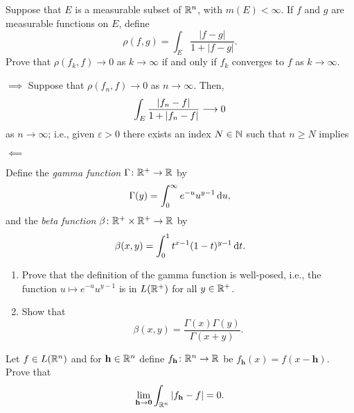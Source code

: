 \begin{problem}
  Suppose that \(E\) is a measurable subset of \(\mathbb{R}^n\), with
  \(m(E)<\infty\). If \(f\) and \(g\) are measurable functions on \(E\),
  define
  \[
    \rho(f,g)=\int_E\frac{|f-g|}{1+|f-g|}.
  \]
  Prove that \(\rho(f_k,f)\to 0\) as \(k\to\infty\) if and only if \(f_k\)
  converges to \(f\) as \(k\to\infty\).
\end{problem}
\begin{solution}
  \(\implies\) Suppose that \(\rho(f_n,f)\to 0\) as \(n\to\infty\). Then,
  \[
    \int_E\frac{|f_n-f|}{1+|f_n-f|}\longrightarrow 0
  \]
  as \(n\to\infty\); i.e., given \(\varepsilon>0\) there exists an index
  \(N\in\mathbb{N}\) such that \(n\geq N\) implies

  \(\impliedby\)
\end{solution}

\begin{problem}
  Define the \emph{gamma function} \(\Gamma\colon\mathbb{R}^+\to\mathbb{R}\) by
  \[
    \Gamma(y)=\int_0^\infty e^{-u}u^{y-1}\mathop{}\!\mathrm{d} u,
  \]
  and the \emph{beta function} \(\beta\colon\mathbb{R}^+\times\mathbb{R}^+\to\mathbb{R}\) by
  \[
    \beta(x,y)=\int_0^1 t^{x-1}(1-t)^{y-1}\mathop{}\!\mathrm{d} t.
  \]
  \begin{enumerate}[label=(\alph*)]
  \item Prove that the definition of the gamma function is well-posed,
    i.e., the function \(u\mapsto e^{-u}u^{y-1}\) is in \(L(\mathbb{R}^+)\) for
    all \(y\in\mathbb{R}^+\).
  \item Show that
    \[
      \beta(x,y)=\frac{\Gamma(x)\Gamma(y)}{\Gamma(x+y)}.
    \]
  \end{enumerate}
\end{problem}
\begin{solution}
\end{solution}

\begin{problem}
  Let \(f\in L(\mathbb{R}^n)\) and for \(\mathbf{h}\in\mathbb{R}^n\) define
  \(f_{\mathbf{h}}\colon\mathbb{R}^n\to\mathbb{R}\) be
  \(f_{\mathbf{h}}( x )= f( x -\mathbf{h})\). Prove that
  \[
    \lim_{\mathbf{h}\to\mathbf{0}}\int_{\mathbb{R}^n}\left|f_{\mathbf{h}}-f\right|=0.
  \]
\end{problem}
\begin{solution}
\end{solution}

